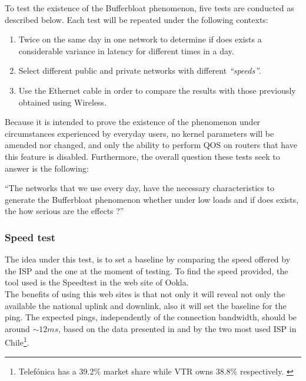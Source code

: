 To test the existence of the Bufferbloat phenomenon, five tests are conducted 
as described below. Each test will be repeated under the following contexts:

\begin{enumerate}
\item Twice on the same day in one network to determine if does exists a 
considerable variance in latency for different times in a day.
\item Select different public and private networks with different 
\textit{``speeds''}.
\item Use the Ethernet cable in order to compare the results with those 
previously obtained using Wireless.
\end{enumerate}

Because it is intended to prove the existence of the phenomenon under
circumstances experienced by everyday users, no kernel parameters will be
amended nor changed, and only the  ability to perform QOS on routers that have
this feature is disabled.  Furthermore, the overall question these tests seek
to answer is the following:\\

\begin{theoremnon}[] 
``The networks that we use every day, have the necessary characteristics to
generate the  Bufferbloat phenomenon whether under low loads and if does
exists, the how  serious are the effects ?''
\end{theoremnon}

\subsubsection{Speed test} 
The idea under this test, is to set a baseline by comparing the speed offered 
by the ISP and the one at the moment of testing. To find the speed provided, 
the  tool used is the Speedtest in the web site of Ookla.\\

The benefits of using this web sites is that not only it will reveal not only
the available the national uplink and downlink, also it will set the baseline
for the ping. The expected pings, independently of the connection bandwidth,
should be around $\sim12ms$, based on the data presented in \cite{netvtr} and
\cite{netmov} by the two most used ISP in Chile\footnote{Telef\'onica has a
39.2\% market share while VTR owns 38.8\% respectively. \cite{ispshares}}.\\

